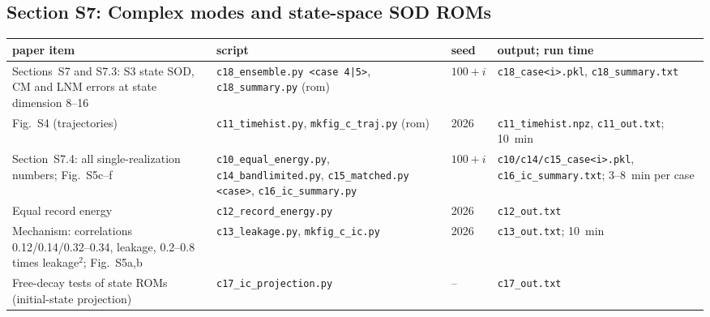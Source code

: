 \documentclass[10pt]{article}
\newcommand{\f}[1]{\texttt{#1}}
\begin{document}
\subsection*{Section S7: Complex modes and state-space SOD ROMs}
\begin{longtable}{L{0.31\textwidth}L{0.25\textwidth}L{0.08\textwidth}L{0.25\textwidth}}
\toprule
paper item & script & seed & output; run time\\ \midrule
Sections~S7 and S7.3: S3 state SOD, CM and LNM errors at state dimension 8--16 & \f{c18\_\allowbreak{}ensemble.py <case 4|5>}, \f{c18\_\allowbreak{}summary.py} (rom) & $100+i$ & \f{c18\_\allowbreak{}case<i>.pkl}, \f{c18\_\allowbreak{}summary.txt}\\
Fig.~S4 (trajectories) & \f{c11\_\allowbreak{}timehist.py}, \f{mkfig\_\allowbreak{}c\_\allowbreak{}traj.py} (rom) & 2026 & \f{c11\_\allowbreak{}timehist.npz}, \f{c11\_\allowbreak{}out.txt}; 10~min\\
Section~S7.4: all single-realization numbers; Fig.~S5c--f & \f{c10\_\allowbreak{}equal\_\allowbreak{}energy.py}, \f{c14\_\allowbreak{}bandlimited.py}, \f{c15\_\allowbreak{}matched.py} \f{<case>}, \f{c16\_\allowbreak{}ic\_\allowbreak{}summary.py} & $100+i$ & \f{c10/\allowbreak{}c14/\allowbreak{}c15\_\allowbreak{}case<i>.pkl}, \f{c16\_\allowbreak{}ic\_\allowbreak{}summary.txt}; 3--8~min per case\\
Equal record energy & \f{c12\_\allowbreak{}record\_\allowbreak{}energy.py} & 2026 & \f{c12\_\allowbreak{}out.txt}\\
Mechanism: correlations 0.12/0.14/0.32--0.34, leakage, 0.2--0.8 times leakage$^2$; Fig.~S5a,b & \f{c13\_\allowbreak{}leakage.py}, \f{mkfig\_\allowbreak{}c\_\allowbreak{}ic.py} & 2026 & \f{c13\_\allowbreak{}out.txt}; 10~min\\
Free-decay tests of state ROMs (initial-state projection) & \f{c17\_\allowbreak{}ic\_\allowbreak{}projection.py} & -- & \f{c17\_\allowbreak{}out.txt}\\
\bottomrule
\end{longtable}
\end{document}
